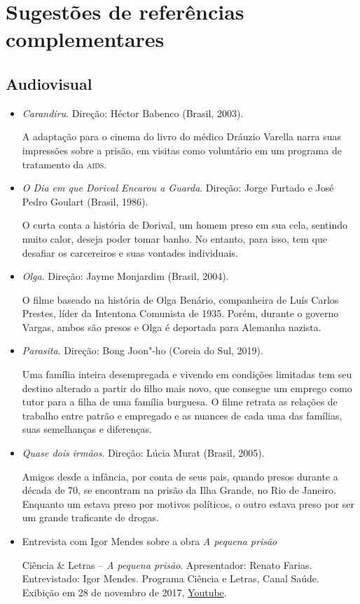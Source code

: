 \documentclass[11pt]{extarticle}
\begin{document}
\section{Sugestões de referências complementares}

\subsection{Audiovisual}

\begin{itemize}
\item\textit{Carandiru}. Direção: Héctor Babenco (Brasil, 2003).

A adaptação para o cinema do livro do médico Dráuzio Varella narra suas 
impressões sobre a prisão, em visitas como voluntário em um programa 
de tratamento da \textsc{aids}.

\item\textit{O Dia em que Dorival Encarou a Guarda}. Direção: Jorge Furtado e José Pedro Goulart (Brasil, 1986).

O curta conta a história de Dorival, um homem preso em sua cela, 
sentindo muito calor, deseja poder tomar banho. No entanto, 
para isso, tem que desafiar os carcereiros e suas vontades 
individuais.

\item\textit{Olga}. Direção: Jayme Monjardim (Brasil, 2004).

O filme baseado na história de Olga Benário, companheira de Luís 
Carlos Prestes, líder da Intentona Comunista de 1935. Porém, durante 
o governo Vargas, ambos são presos e Olga é deportada para Alemanha 
nazista.

\item\textit{Parasita}. Direção: Bong Joon"-ho (Coreia do Sul, 2019).

Uma família inteira desempregada e vivendo em condições limitadas tem 
seu destino alterado a partir do filho mais novo, que consegue um emprego 
como tutor para a filha de uma família burguesa. O filme retrata as relações 
de trabalho entre patrão e empregado e as nuances de cada uma das famílias, 
suas semelhanças e diferenças.

\item\textit{Quase dois irmãos}. Direção: Lúcia Murat (Brasil, 2005).

Amigos desde a infância, por conta de seus pais, quando presos durante 
a década de 70, se encontram na prisão da Ilha Grande, no Rio de Janeiro. 
Enquanto um estava preso por motivos políticos, o outro estava preso por 
ser um grande traficante de drogas.

\item Entrevista com Igor Mendes sobre a obra \emph{A pequena prisão}

Ciência \& Letras -- \emph{A
pequena prisão}. 
Apresentador: Renato Farias. Entrevistado: Igor Mendes. 
Programa Ciência e Letras, Canal Saúde. Exibição em 28 de novembro de 2017, \href{youtube.com/kwLs4aImRRM}{{Youtube}}.
\end{itemize}
\end{document}
